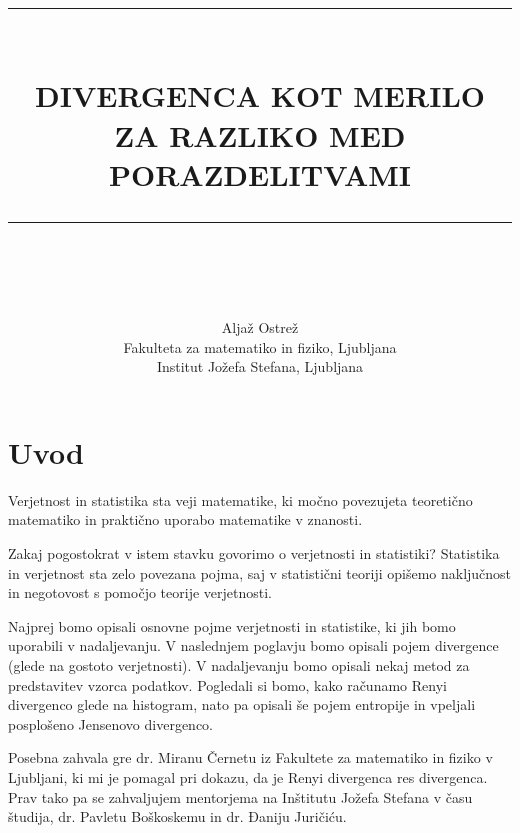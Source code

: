 \documentclass[a4paper, 12pt]{article}
\newcommand{\HRule}[1]{\rule{\linewidth}{#1}}
\theoremstyle{definition}
\begin{document}
\title{ \HRule{2pt} \\
        \LARGE \textbf{\uppercase{Divergenca kot merilo za razliko med porazdelitvami}}
        \HRule{2pt} \\ [0.5cm]
        \normalsize \vspace*{5\baselineskip}}

\author{
        Aljaž Ostrež \\ 
		Fakulteta za matematiko in fiziko, Ljubljana \\ 
		Institut Jožefa Stefana, Ljubljana \\}

\maketitle
\thispagestyle{empty}
\newpage

\setcounter{page}{1}


\tableofcontents
\newpage


\section*{Uvod}

Verjetnost in statistika sta veji matematike, ki močno povezujeta teoretično matematiko in praktično uporabo matematike v znanosti.

Zakaj pogostokrat v istem stavku govorimo o verjetnosti in statistiki? Statistika in verjetnost sta zelo povezana pojma, saj v statistični teoriji opišemo naključnost in negotovost s pomočjo teorije verjetnosti.

Najprej bomo opisali osnovne pojme verjetnosti in statistike, ki jih bomo uporabili v nadaljevanju. V naslednjem poglavju bomo opisali pojem divergence (glede na gostoto verjetnosti). V nadaljevanju bomo opisali nekaj metod za predstavitev vzorca podatkov. Pogledali si bomo, kako računamo Renyi divergenco glede na histogram, nato pa opisali še pojem entropije in vpeljali posplošeno Jensenovo divergenco.

Posebna zahvala gre dr. Miranu Černetu iz Fakultete za matematiko in fiziko v Ljubljani, ki mi je pomagal pri dokazu, da je Renyi divergenca res divergenca. Prav tako pa se zahvaljujem mentorjema na Inštitutu Jožefa Stefana v času študija, dr. Pavletu Boškoskemu in dr. Đaniju Juričiću.
\end{document}
